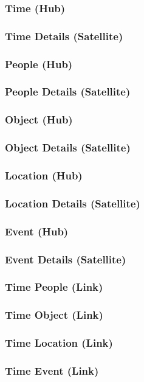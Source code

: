 \documentclass{acm_proc_article-sp}
\begin{document}
\subsubsection{Time (Hub)}
\subsubsection{Time Details (Satellite)}
\subsubsection{People (Hub)}
\subsubsection{People Details (Satellite)}
\subsubsection{Object (Hub)}
\subsubsection{Object Details (Satellite)}
\subsubsection{Location (Hub)}
\subsubsection{Location Details (Satellite)}
\subsubsection{Event (Hub)}
\subsubsection{Event Details (Satellite)}
\subsubsection{Time People (Link)}
\subsubsection{Time Object (Link)}
\subsubsection{Time Location (Link)}
\subsubsection{Time Event (Link)}
\end{document}
